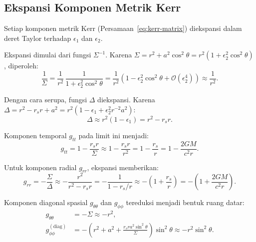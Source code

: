 \subsection{Ekspansi Komponen Metrik Kerr}
\label{subsec:ekspansi-metrik}

Setiap komponen metrik Kerr (Persamaan~\ref{eq:kerr-matrix})
diekspansi dalam deret Taylor terhadap $\epsilon_1$ dan $\epsilon_2$.

Ekspansi dimulai dari fungsi $\Sigma^{-1}$.
Karena $\Sigma = r^2 + a^2\cos^2\!\theta = r^2(1 + \epsilon_2^2\cos^2\!\theta)$, diperoleh:
\begin{equation}
    \frac{1}{\Sigma} = \frac{1}{r^2}\,\frac{1}{1 + \epsilon_2^2\cos^2\!\theta}
    = \frac{1}{r^2}\left(1 - \epsilon_2^2\cos^2\!\theta + \mathcal{O}(\epsilon_2^4)\right)
    \approx \frac{1}{r^2}.
    \label{eq:sigma-inv-expand}
\end{equation}

Dengan cara serupa, fungsi $\Delta$ diekspansi.
Karena $\Delta = r^2 - r_s r + a^2 = r^2(1 - \epsilon_1 + \epsilon_2^2 r^{-2} a^2)$:
\begin{equation}
    \Delta \approx r^2(1 - \epsilon_1) = r^2 - r_s r.
    \label{eq:delta-expand}
\end{equation}

Komponen temporal $g_{tt}$ pada limit ini menjadi:
\begin{equation}
    g_{tt} = 1 - \frac{r_s r}{\Sigma}
    \approx 1 - \frac{r_s r}{r^2}
    = 1 - \frac{r_s}{r}
    = 1 - \frac{2GM}{c^2 r}.
    \label{eq:gtt-wf}
\end{equation}

Untuk komponen radial $g_{rr}$, ekspansi memberikan:
\begin{equation}
    g_{rr} = -\frac{\Sigma}{\Delta}
    \approx -\frac{r^2}{r^2 - r_s r}
    = -\frac{1}{1 - r_s/r}
    \approx -\left(1 + \frac{r_s}{r}\right)
    = -\left(1 + \frac{2GM}{c^2 r}\right).
    \label{eq:grr-wf}
\end{equation}

Komponen diagonal spasial $g_{\theta\theta}$ dan $g_{\phi\phi}$
tereduksi menjadi bentuk ruang datar:
\begin{align}
    g_{\theta\theta} &= -\Sigma \approx -r^2,
    \label{eq:gthetatheta-wf} \\[4pt]
    g_{\phi\phi}^{(\text{diag})} &= -\left(r^2 + a^2
    + \frac{r_s r a^2\sin^2\!\theta}{\Sigma}\right)\sin^2\!\theta
    \approx -r^2\sin^2\!\theta.
    \label{eq:gphiphi-wf}
\end{align}

